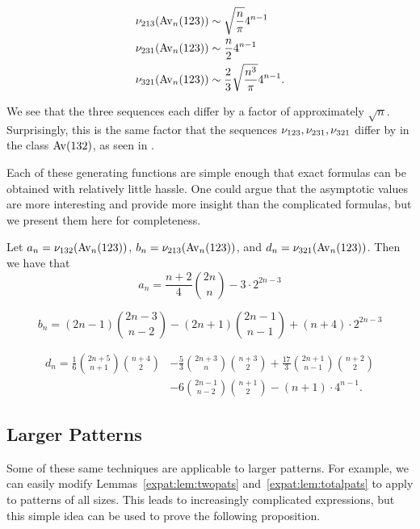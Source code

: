   \vspace{1pc}

  $$ \begin{aligned}
   \nu_{213} (\operatorname{{Av}}_n(123)) &\sim \sqrt{\frac{n}{\pi}} 4^{n-1} \\
   \nu_{231} (\operatorname{{Av}}_n(123)) &\sim \frac{n}{2} 4^{n-1}  \\
   \nu_{321} (\operatorname{{Av}}_n(123)) &\sim \frac{2}{3} \sqrt{\frac{n^3}{\pi}} 4^{n-1}. 
  \end{aligned} $$

  We see that the three sequences each differ by a factor of
  approximately $\sqrt{n}$. Surprisingly, this is the same factor that
  the sequences $\nu_{123}, \nu_{231}, \nu_{321}$ differ by in the
  class $\operatorname{{Av}} (132)$, as seen in \cite{Bona2012}.

  Each of these generating functions are simple enough that exact
  formulas can be obtained with relatively little hassle. One could
  argue that the asymptotic values are more interesting and
  provide more insight than the complicated formulas, but we present
  them here for completeness.

  \begin{corollary}
    Let $a_n = \nu_{132}(\operatorname{{Av}}_n(123))$, $b_n = \nu_{213}(\operatorname{{Av}}_n(123))$, and $d_n =
    \nu_{321}(\operatorname{{Av}}_n(123))$. Then we have that
    $$ a_n = \frac{n+2}{4} \binom{2n}{n} - 3 \cdot 2^{2n-3} $$

    \vspace{1pc}

    $$ b_n = (2n-1) \binom{2n-3}{n-2} - (2n+1)\binom{2n-1}{n-1} +
       (n+4) \cdot 2^{2n-3}$$
    
    \vspace{1pc}

    $$ \begin{aligned} d_n
        = \frac{1}{6} \binom{2n+5}{n+1} \binom{n+4}{2}
        &- \frac{5}{3} \binom{2n+3}{n} \binom{n+3}{2}
        + \frac{17}{3} \binom{2n+1}{n-1} \binom{n+2}{2} \\
        &- 6\binom{2n-1}{n-2} \binom{n+1}{2} - (n+1) \cdot 4^{n-1}.
      \end{aligned}
    $$
  \end{corollary}

\subsection{Larger Patterns}

  Some of these same techniques are applicable to larger patterns.  For
  example, we can easily modify Lemmas~\ref{expat:lem:twopats}
  and~\ref{expat:lem:totalpats} to apply to patterns of all sizes. This leads to
  increasingly complicated expressions, but this simple idea can be used to
  prove the following proposition. 

